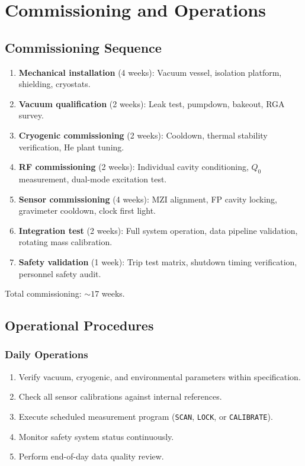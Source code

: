 \documentclass[11pt,a4paper]{article}
\begin{document}
\section{Commissioning and Operations}

\subsection{Commissioning Sequence}

\begin{enumerate}[nosep]
\item \textbf{Mechanical installation} (4 weeks): Vacuum vessel,
isolation platform, shielding, cryostats.
\item \textbf{Vacuum qualification} (2 weeks): Leak test,
pumpdown, bakeout, RGA survey.
\item \textbf{Cryogenic commissioning} (2 weeks): Cooldown,
thermal stability verification, He plant tuning.
\item \textbf{RF commissioning} (2 weeks): Individual cavity
conditioning, $Q_0$ measurement, dual-mode excitation test.
\item \textbf{Sensor commissioning} (4 weeks): MZI alignment,
FP cavity locking, gravimeter cooldown, clock first light.
\item \textbf{Integration test} (2 weeks): Full system operation,
data pipeline validation, rotating mass calibration.
\item \textbf{Safety validation} (1 week): Trip test matrix,
shutdown timing verification, personnel safety audit.
\end{enumerate}

Total commissioning: $\sim 17$ weeks.

\subsection{Operational Procedures}

\subsubsection{Daily Operations}

\begin{enumerate}[nosep]
\item Verify vacuum, cryogenic, and environmental parameters
within specification.
\item Check all sensor calibrations against internal references.
\item Execute scheduled measurement program (\texttt{SCAN},
\texttt{LOCK}, or \texttt{CALIBRATE}).
\item Monitor safety system status continuously.
\item Perform end-of-day data quality review.
\end{enumerate}
\end{document}
